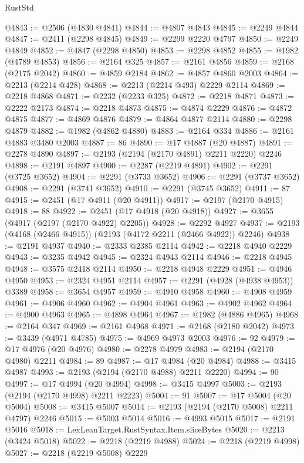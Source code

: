 \begin{lexlean}{RustStd}
\begin{coremodule}
@4843 := @2506 (@4830 @4841)
@4844 := @4807 @4843
@4845 := @2249 @4844
@4847 := @2411 (@2298 @4845)
@4849 := @2299 @2220 @4797
@4850 := @2249 @4849
@4852 := @4847 (@2298 @4850)
@4853 := @2298 @4852
@4855 := @1982 (@4789 @4853)
@4856 := @2164 @325
@4857 := @2161 @4856
@4859 := @2168 (@2175 @2042)
@4860 := @4859 @2184
@4862 := @4857 @4860 @2003
@4864 := @2213 (@2214 @428)
@4868 := @2213 (@2214 @493) @2229 @2114
@4869 := @2218 @4868
@4871 := @2232 (@2233 @325)
@4872 := @2218 @4871
@4873 := @2222 @2173
@4874 := @2218 @4873
@4875 := @4874 @2229
@4876 := @4872 @4875
@4877 := @4869 @4876
@4879 := @4864 @4877 @2114
@4880 := @2298 @4879
@4882 := @1982 (@4862 @4880)
@4883 := @2164 @334
@4886 := @2161 @4883 @3480 @2003
@4887 := 86
@4890 := @17 @4887 (@20 @4887)
@4891 := @2278 @4890
@4897 := @2193 (@2194 (@2170 @4891) @2211 @2220) @2246
@4898 := @2191 @4897
@4900 := @2287 (@2219 @4891)
@4902 := @2291 (@3725 @3652)
@4904 := @2291 (@3733 @3652)
@4906 := @2291 (@3737 @3652)
@4908 := @2291 (@3741 @3652)
@4910 := @2291 (@3745 @3652)
@4911 := 87
@4915 := @2451 (@17 @4911 (@20 @4911))
@4917 := @2197 (@2170 @4915)
@4918 := 88
@4922 := @2451 (@17 @4918 (@20 @4918))
@4927 := @3655 (@4917 (@2197 (@2170 @4922) @2205))
@4928 := @2292 @4927
@4937 := @2193 (@4168 (@2466 @4915)) (@2193 (@4172 @2211 (@2466 @4922)) @2246)
@4938 := @2191 @4937
@4940 := @2333 @2385 @2114
@4942 := @2218 @4940 @2229
@4943 := @3235 @4942
@4945 := @2324 @4943 @2114
@4946 := @2218 @4945
@4948 := @3575 @2418 @2114
@4950 := @2218 @4948 @2229
@4951 := @4946 @4950
@4953 := @2324 @4951 @2114
@4957 := @2291 (@4928 (@4938 @4953)) @3389
@4958 := @3654 @4957
@4959 := @4910 @4958
@4960 := @4908 @4959
@4961 := @4906 @4960
@4962 := @4904 @4961
@4963 := @4902 @4962
@4964 := @4900 @4963
@4965 := @4898 @4964
@4967 := @1982 (@4886 @4965)
@4968 := @2164 @347
@4969 := @2161 @4968
@4971 := @2168 (@2180 @2042)
@4973 := @3439 (@4971 @4785)
@4975 := @4969 @4973 @2003
@4976 := 92
@4979 := @17 @4976 (@20 @4976)
@4980 := @2278 @4979
@4983 := @2194 (@2170 @4980) @2211
@4984 := 89
@4987 := @17 @4984 (@20 @4984)
@4988 := @3415 @4987
@4993 := @2193 (@2194 (@2170 @4988) @2211 @2220)
@4994 := 90
@4997 := @17 @4994 (@20 @4994)
@4998 := @3415 @4997
@5003 := @2193 (@2194 (@2170 @4998) @2211 @2223)
@5004 := 91
@5007 := @17 @5004 (@20 @5004)
@5008 := @3415 @5007
@5014 := @2193 (@2194 (@2170 @5008) @2211 @4797) @2246
@5015 := @5003 @5014
@5016 := @4993 @5015
@5017 := @2191 @5016
@5018 := LexLeanTarget.RustSyntax.Item.sliceBytes
@5020 := @2213 (@3424 @5018)
@5022 := @2218 (@2219 @4988)
@5024 := @2218 (@2219 @4998)
@5027 := @2218 (@2219 @5008) @2229

\end{coremodule}
\end{lexlean}
